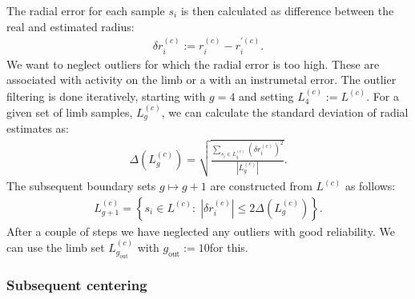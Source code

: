 \documentclass{aa}
\newcommand{\eqnl}[2]{\begin{eqnarray}\label{#1}#2\end{eqnarray}}
\newcommand{\s}[2]{{#1}_{\mathrm{#2}}}
\begin{document}
  
  The radial error for each sample $s_i$ is then calculated as difference between the real and estimated radius:
  \eqnl{calib_deviation1}{
  \delta r_i^{(c)} := r_i^{(c)} - r_i^{\prime(c)} \text{.}
  }
   We want to neglect outliers for which the radial error is too high. These are associated with activity on the limb or 
  a with an instrumetal error. The outlier filtering is done iteratively, starting with $g=4$ and setting $L^{(c)}_4 := 
  L^{(c)}$.
  For a given set of limb samples, $L^{(c)}_g$, we can calculate the standard deviation of radial estimates as:
  \eqnl{calib_deviation2}{
  \Delta \left( L^{(c)}_g \right) = \sqrt{\frac{\sum \limits_{s_i \in L^{(c)}_g} \left( \delta r_i^{(c)} \right)^2}{\left|L^{(c)}_g \right|}} \text{.}
  }
  The subsequent boundary sets $g \mapsto g+1$ are constructed from $L^{(c)}$ as follows:
  \eqnl{calib_deviation3}{
  L^{(c)}_{g+1} = \left\{ s_i \in L^{(c)} : \; \left|\delta r_i^{(c)} \right| \le 2 \Delta \left( L^{(c)}_{g} \right) \right\} \text{.}
  }
  After a couple of steps we have neglected any outliers with good reliability. We can use the limb set $L^{(c)}_{\s{g}{out}}$ with $\s{g}{out} := 10$for this.

  \subsubsection{Subsequent centering} \label{sect:subsequent_centering}
\end{document}
